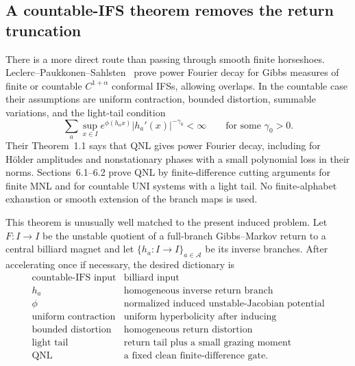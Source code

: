\documentclass[11pt]{article}
\begin{document}
\subsection{A countable-IFS theorem removes the return truncation}
\label{subsec:countable-ifs}

There is a more direct route than passing through smooth finite horseshoes.
Leclerc--Paukkonen--Sahlsten~\cite{LPS} prove power Fourier decay for Gibbs measures of
finite or countable $C^{1+\alpha}$ conformal IFSs, allowing overlaps.  In the
countable case their assumptions are uniform contraction, bounded distortion,
summable variations, and the light-tail condition
\begin{equation}
\label{eq:lps-light-tail}
 \sum_{a}\sup_{x\in I}
 e^{\phi(h_a x)}|h_a'(x)|^{-\gamma_0}<\infty
 \qquad\text{for some }\gamma_0>0.
\end{equation}
Their Theorem~1.1 says that QNL gives power Fourier decay, including for
H\"older amplitudes and nonstationary phases with a small polynomial loss in
their norms.  Sections~6.1--6.2 prove QNL by finite-difference cutting
arguments for finite MNL and for countable UNI systems with a light tail.  No
finite-alphabet exhaustion or smooth extension of the branch maps is used.

This theorem is unusually well matched to the present induced problem.  Let
$F:I\to I$ be the unstable quotient of a full-branch Gibbs--Markov return to
a central billiard magnet and let $\{h_a:I\to I\}_{a\in\mathcal A}$ be its
inverse branches.  After accelerating once if necessary, the desired
dictionary is
\begin{equation}
\label{eq:lps-dictionary}
 \begin{array}{c|c}
 \text{countable-IFS input}&\text{billiard input}\\ \hline
 h_a&\text{homogeneous inverse return branch}\\
 \phi&\text{normalized induced unstable-Jacobian potential}\\
 \text{uniform contraction}&\text{uniform hyperbolicity after inducing}\\
 \text{bounded distortion}&\text{homogeneous return distortion}\\
 \text{light tail}&\text{return tail plus a small grazing moment}\\
 \text{QNL}&\text{a fixed clean finite-difference gate}.
 \end{array}
\end{equation}
\end{document}
